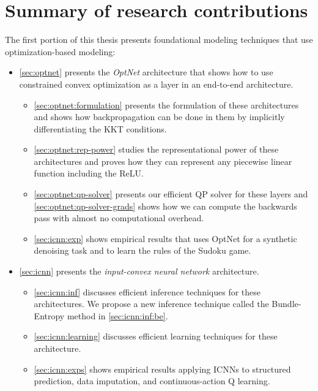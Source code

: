 \section{Summary of research contributions}
The first portion of this thesis presents foundational
modeling techniques that use optimization-based modeling:
\begin{itemize}
\item \cref{sec:optnet} presents the \emph{OptNet} architecture
  that shows how to use constrained convex optimization
  as a layer in an end-to-end architecture.
  \begin{itemize}
  \item \cref{sec:optnet:formulation} presents the
    formulation of these architectures and shows how
    backpropagation can be done in them by
    implicitly differentiating the KKT conditions.
  \item \cref{sec:optnet:rep-power} studies the
    representational power of these architectures and proves
    how they can represent any piecewise linear function
    including the ReLU.
  \item \cref{sec:optnet:qp-solver} presents our
    efficient QP solver for these layers and
    \cref{sec:optnet:qp-solver-grads}
    shows how we can compute the backwards pass with
    almost no computational overhead.
  \item \cref{sec:icnn:exp} shows empirical results
    that uses OptNet for a synthetic denoising task
    and to learn the rules of the Sudoku game.
  \end{itemize}
\item \cref{sec:icnn} presents the \emph{input-convex neural
  network} architecture.
  \begin{itemize}
  \item \cref{sec:icnn:inf} discusses efficient inference
    techniques for these architectures.
    We propose a new inference technique called the Bundle-Entropy
    method in \cref{sec:icnn:inf:be}.
  \item \cref{sec:icnn:learning} discusses efficient
    learning techniques for these architecture.
  \item \cref{sec:icnn:exps} shows empirical results applying
    ICNNs to structured prediction, data imputation, and
    continuous-action Q learning.
  \end{itemize}
\end{itemize}

